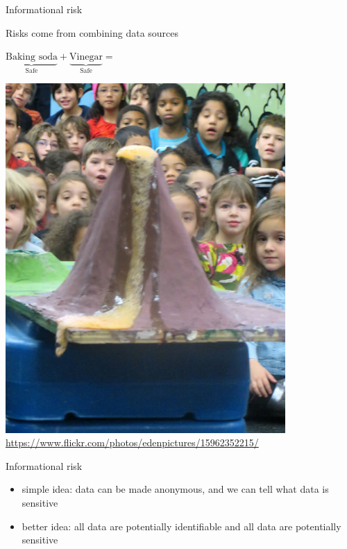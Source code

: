 \documentclass{beamer}
\begin{document}
\begin{frame}{Informational risk}

Risks come from combining data sources\\

\vfill

\begin{minipage}[c]{0.35\textwidth}
$\underbrace{\text{Baking soda}}_{\text{Safe}} + \underbrace{\text{Vinegar}}_{\text{Safe}} =$
\end{minipage}
\hspace{0.05\textwidth}
\begin{minipage}[c]{0.55\textwidth}
{
\includegraphics[width=0.8\textwidth]{figures/baking_soda_volcano}\\ {\tiny \url{https://www.flickr.com/photos/edenpictures/15962352215/}}
}
\end{minipage}

\end{frame}
\begin{frame}{Informational risk}

\begin{itemize}
\item simple idea: data can be made anonymous, and we can tell what data is sensitive
\item better idea: all data are potentially identifiable and all data are potentially sensitive
\end{itemize}

\end{frame}
\end{document}
